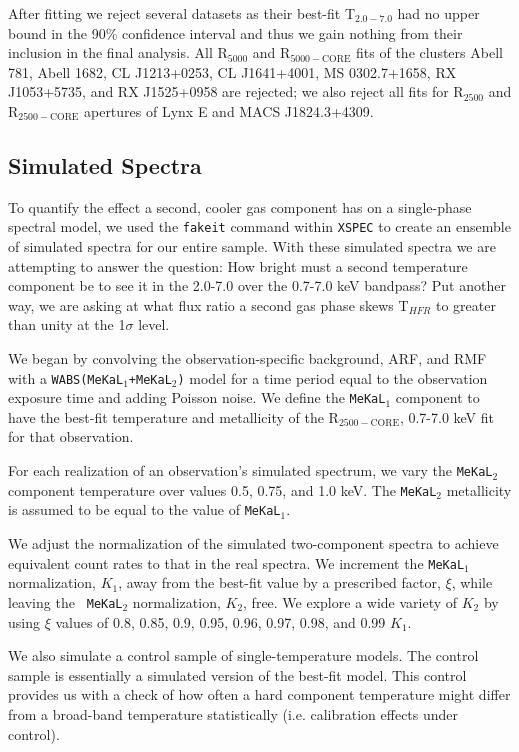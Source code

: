 \documentclass{emulateapj}
\newcommand{\tf}{T$_{HFR}$ }
\newcommand{\hard}{T$_{2.0-7.0}$ }
\begin{document}
After fitting we reject several datasets as their best-fit \hard
had no upper bound in the 90\% confidence interval and thus we gain
nothing from their inclusion in the final analysis. All R$_{5000}$ and
R$_{5000-\text{CORE}}$ fits of the clusters Abell 781, Abell 1682, CL
J1213+0253, CL J1641+4001, MS 0302.7+1658, RX J1053+5735, and RX
J1525+0958 are rejected; we also reject all fits for R$_{2500}$ and
R$_{2500-\text{CORE}}$ apertures of Lynx E and MACS J1824.3+4309.

\subsection{Simulated Spectra}\label{sec:simulated}

To quantify the effect a second, cooler gas component has on a
single-phase spectral model, we used the {\tt fakeit} command within
{\tt XSPEC} to create an ensemble of simulated spectra for our entire
sample. With these simulated spectra we are attempting to answer the
question: How bright must a second temperature component be to see it
in the 2.0-7.0 over the 0.7-7.0 keV bandpass?  Put another
way, we are asking at what flux ratio a second gas phase skews
\tf to greater than unity at the 1$\sigma$ level.

We began by convolving the observation-specific background, ARF, and RMF
with a {\tt WABS(MeKaL$_{1}$+MeKaL$_{2}$)} model for a time period equal to
the observation exposure time and adding Poisson noise. We define the
{\tt MeKaL$_1$} component to have the best-fit temperature and metallicity of
the R$_{2500-\text{CORE}}$, 0.7-7.0 keV fit for that observation.

For each realization of an observation's simulated spectrum, we vary
the {\tt MeKaL$_2$} component temperature over values 0.5, 0.75, and
1.0 keV. The {\tt MeKaL$_2$} metallicity is assumed to be equal to the
value of {\tt MeKaL$_1$}.

We adjust the normalization of the simulated two-component spectra to
achieve equivalent count rates to that in the real spectra. We
increment the {\tt MeKaL$_1$} normalization, $K_1$, away from the
best-fit value by a prescribed factor, $\xi$, while leaving the {\tt
MeKaL$_2$} normalization, $K_2$, free. We explore
a wide variety of $K_2$ by using $\xi$ values of 0.8, 0.85, 0.9, 0.95,
0.96, 0.97, 0.98, and 0.99 $K_1$.

We also simulate a control sample of single-temperature models. The
control sample is essentially a simulated version of the best-fit
model. This control provides us with a check of how often a hard
component temperature might differ from a broad-band temperature
statistically (i.e. calibration effects under control).
\end{document}

